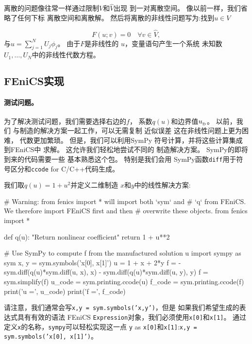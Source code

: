 离散的问题像往常一样通过限制$V$和$\hat V$出现
到一对离散空间。 像以前一样，我们省略了任何下标
离散空间和离散解。
然后将离散的非线性问题写为:找到$u \in V$

\begin{equation}
  F(u; v) = 0 \quad \forall v \in \hat{V},
\label{ch:poisson0:nonlinear:d}
\end{equation}
与$u = \sum_{j=1}^N U_j \phi_j$。 由于$F$是非线性的
$u$，变量语句产生一个系统
未知数$U_1,\ldots,U_N$中的非线性代数方程。

\subsection{FEniCS实现}
\label{ftut:nonlinear:Newton:auto}

\paragraph{测试问题。}
为了解决测试问题，我们需要选择右边的$f$，
系数$q(u)$和边界值$\ub$。 以前，我们
与制造的解决方案一起工作，可以无需复制
近似误差 这在非线性问题上更为困难，
代数更加繁琐。 但是，我们可以利用SymPy
符号计算，并将这些计算集成到FEniCS中
求解。 这允许我们轻松地尝试不同的
制造解决方案。 SymPy的即将到来的代码需要一些
基本熟悉这个包。 特别是我们会用
SymPy函数\texttt{diff}用于符号区分和\texttt{ccode} for
C/C++代码生成。

我们取$q(u) = 1 + u^2$并定义二维制造
$x$和$y$中的线性解决方案:

\begin{python}
# Warning: from fenics import * will import both `sym` and
# `q` from FEniCS. We therefore import FEniCS first and then
# overwrite these objects.
from fenics import *

def q(u):
    "Return nonlinear coefficient"
    return 1 + u**2

# Use SymPy to compute f from the manufactured solution u
import sympy as sym
x, y = sym.symbols('x[0], x[1]')
u = 1 + x + 2*y
f = - sym.diff(q(u)*sym.diff(u, x), x) - sym.diff(q(u)*sym.diff(u, y), y)
f = sym.simplify(f)
u_code = sym.printing.ccode(u)
f_code = sym.printing.ccode(f)
print('u =', u_code)
print('f =', f_code)
\end{python}


\begin{notice}
请注意，我们通常会写\texttt{x,y = sym.symbols('x,y')}，但是
如果我们希望生成的表达式具有有效的语法
FEniCS \texttt{Expression}对象，我们必须使用\texttt{x[0]}和\texttt{x[1]}。
通过定义\texttt{x}的名称，\texttt{sympy}可以轻松实现这一点
\texttt{y} as \texttt{x[0]}和\texttt{x[1]}:\texttt{x,y = sym.symbols('x[0], x[1]')}。
\end{notice}

